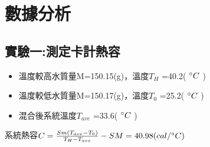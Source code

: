 \documentclass[12pt]{article}
\begin{document}
\section{\textbf{數據分析}}
\subsection{實驗一:測定卡計熱容}
    \begin{itemize}
        \item 溫度較高水質量M=150.15(g)，溫度$T_H$ =40.2( $\degree C$ )
        \item 溫度較低水質量M=150.17(g)，溫度$T_0$ =25.2( $\degree C$ )
        \item 混合後系統溫度$T_{ave}$ =33.6( $\degree C$ )
    \end{itemize}
    \begin{center}
        系統熱容$C=\frac{Sm(T_{ave}-T_0)}{T_H-T_{ave}}-SM=40.98(cal/\degree C)$
    \end{center}
\newpage
\end{document}
